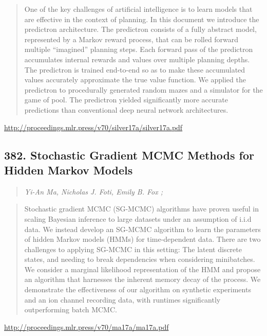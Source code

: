 \documentclass{article}
\begin{document}
\begin{quote}
    One of the key challenges of artificial intelligence is to learn models that are effective in the context of planning. In this document we introduce the predictron architecture. The predictron consists of a fully abstract model, represented by a Markov reward process, that can be rolled forward multiple “imagined” planning steps. Each forward pass of the predictron accumulates internal rewards and values over multiple planning depths. The predictron is trained end-to-end so as to make these accumulated values accurately approximate the true value function. We applied the predictron to procedurally generated random mazes and a simulator for the game of pool. The predictron yielded significantly more accurate predictions than conventional deep neural network architectures.  
\end{quote}

\href{http://proceedings.mlr.press/v70/silver17a/silver17a.pdf}{http://proceedings.mlr.press/v70/silver17a/silver17a.pdf}

\subsection{382. Stochastic Gradient MCMC Methods for Hidden Markov Models}

\begin{quote}
\footnotesize{\textit{Yi-An Ma, Nicholas J. Foti, Emily B. Fox ;}}

\end{quote}

\begin{quote}
    Stochastic gradient MCMC (SG-MCMC) algorithms have proven useful in scaling Bayesian inference to large datasets under an assumption of i.i.d data. We instead develop an SG-MCMC algorithm to learn the parameters of hidden Markov models (HMMs) for time-dependent data. There are two challenges to applying SG-MCMC in this setting: The latent discrete states, and needing to break dependencies when considering minibatches. We consider a marginal likelihood representation of the HMM and propose an algorithm that harnesses the inherent memory decay of the process. We demonstrate the effectiveness of our algorithm on synthetic experiments and an ion channel recording data, with runtimes significantly outperforming batch MCMC.  
\end{quote}

\href{http://proceedings.mlr.press/v70/ma17a/ma17a.pdf}{http://proceedings.mlr.press/v70/ma17a/ma17a.pdf}
\end{document}
